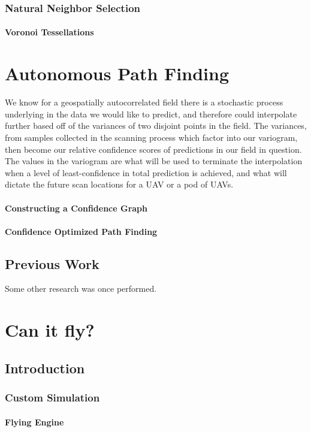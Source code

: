 \documentclass[11pt]{ucthesis}
\begin{document}
\section{Natural Neighbor Selection}
\subsection{Voronoi Tessellations}

\part{Autonomous Path Finding}
We know for a geospatially autocorrelated field there is a stochastic process underlying in the data we would like to predict, and therefore could interpolate further based off of the variances of two disjoint points in the field. The variances, from samples collected in the scanning process which factor into our variogram, then become our relative confidence scores of predictions in our field in question. The values in the variogram are what will be used to terminate the interpolation when a level of least-confidence in total prediction is achieved, and what will dictate the future scan locations for a UAV or a pod of UAVs.
\subsection{Constructing a Confidence Graph}
\subsection{Confidence Optimized Path Finding}

\chapter{Previous Work}
Some other research was once performed.

\part{Can it fly?}
\chapter{Introduction}

\section{Custom Simulation}
\subsection{Flying Engine}
\end{document}
